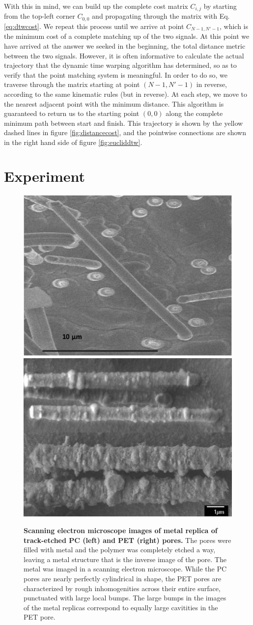 			With this in mind, we can build up the complete cost matrix $C_{i,j}$ by starting from the top-left corner $C_{0,0}$ and propagating through the matrix with Eq. \ref{eq:dtwcost}. We repeat this process until we arrive at point $C_{N-1,N'-1}$, which is the minimum cost of a complete matching up of the two signals. At this point we have arrived at the answer we seeked in the beginning, the total distance metric between the two signals. However, it is often informative to calculate the actual trajectory that the dynamic time warping algorithm has determined, so as to verify that the point matching system is meaningful. In order to do so, we traverse through the matrix starting at point $\left(N-1,N'-1\right)$ in reverse, according to the same kinematic rules (but in reverse). At each step, we move to the nearest adjacent point with the minimum distance. This algorithm is guaranteed to return us to the starting point $\left(0,0\right)$ along the complete minimum path between start and finish. This trajectory is shown by the yellow dashed lines in figure \ref{fig:distancecost}, and the pointwise connections are shown in the right hand side of figure \ref{fig:eucliddtw}.
		
	\section{Experiment}
	    
		\begin{figure}
			\hfill
			\includegraphics[height=0.35\textwidth]{PC}
			\hfill
			\includegraphics[height=0.35\textwidth]{PET}
			\hfill
			\caption{\textbf{Scanning electron microscope images of metal replica of track-etched PC (left) and PET (right) pores.} The pores were filled with metal and the polymer was completely etched a way, leaving a metal structure that is the inverse image of the pore. The metal was imaged in a scanning electron microscope. While the PC pores are nearly perfectly cylindrical in shape, the PET pores are characterized by rough inhomogenities across their entire surface, punctuated with large local bumps. The large bumps in the images of the metal replicas correspond to equally large cavitities in the PET pore.}
			\label{fig:PCPET}
		\end{figure}
		
